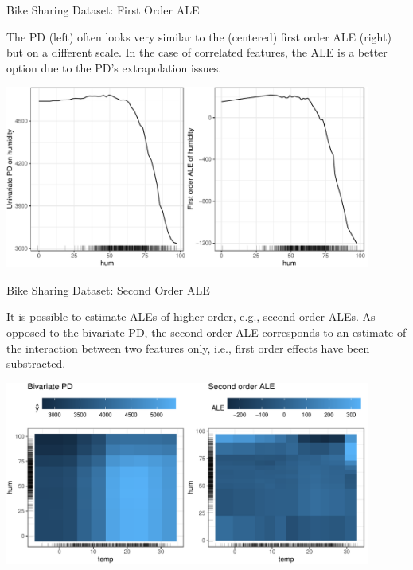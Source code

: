 \documentclass[11pt,compress,t,notes=noshow, xcolor=table]{beamer}
\begin{document}
\begin{vbframe}{Bike Sharing Dataset: First Order ALE}

The PD (left) often looks very similar to the (centered) first order ALE (right) but on a different scale. In the case of correlated features, the ALE is a better option due to the PD's extrapolation issues.


\begin{center}
\includegraphics[width=0.9\textwidth]{figure_man/ale1d}
\end{center}


\end{vbframe}


\begin{vbframe}{Bike Sharing Dataset: Second Order ALE}

It is possible to estimate ALEs of higher order, e.g., second order ALEs. As opposed to the bivariate PD, the second order ALE corresponds to an estimate of the interaction between two features only, i.e., first order effects have been substracted.

\vspace{0.1cm}

\begin{center}
\includegraphics[width=0.9\textwidth]{figure_man/ale2d}
\end{center}

\end{vbframe}


\endlecture
\end{document}
